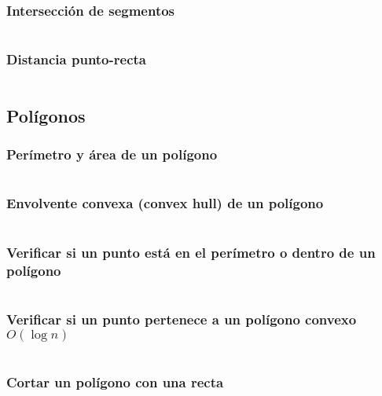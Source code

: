 \documentclass[11pt]{article}
\begin{document}
			\subsubsection{Intersección de segmentos}
			\inputminted[tabsize=2,breaklines,firstline=108,lastline=125,fontsize=\small]{c++}{geometry.cpp}
			
			\subsubsection{Distancia punto-recta}
			\inputminted[tabsize=2,breaklines,firstline=127,lastline=130,fontsize=\small]{c++}{geometry.cpp}
			
		\subsection{Polígonos}
			\subsubsection{Perímetro y área de un polígono}
			\inputminted[tabsize=2,breaklines,firstline=132,lastline=148,fontsize=\small]{c++}{geometry.cpp}
			
			\subsubsection{Envolvente convexa (convex hull) de un polígono}
			\inputminted[tabsize=2,breaklines,firstline=150,lastline=169,fontsize=\small]{c++}{geometry.cpp}
			
			\subsubsection{Verificar si un punto está en el perímetro o dentro de un polígono}
			\inputminted[tabsize=2,breaklines,firstline=171,lastline=195,fontsize=\small]{c++}{geometry.cpp}
			
			\subsubsection{Verificar si un punto pertenece a un polígono convexo $O(\log n)$}
			\inputminted[tabsize=2,breaklines,firstline=197,lastline=220,fontsize=\small]{c++}{geometry.cpp}
			
			\subsubsection{Cortar un polígono con una recta}
			\inputminted[tabsize=2,breaklines,firstline=226,lastline=242,fontsize=\small]{c++}{geometry.cpp}
			
\end{document}
